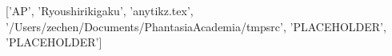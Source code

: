 ['AP', 'Ryoushirikigaku', 'anytikz.tex', '/Users/zechen/Documents/PhantasiaAcademia/tmpsrc', 'PLACEHOLDER', 'PLACEHOLDER']
